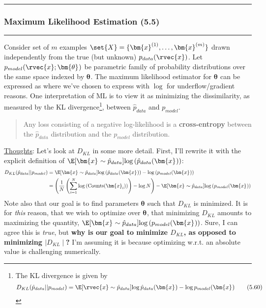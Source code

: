 \documentclass[11pt]{article}
\renewcommand\vec[2][]{\bm{#2}_{#1}}
\newcommand\myspace[1][]{\vspace{#1\bigskipamount}}
\newcommand\p{\Needspace{10\baselineskip} \noindent}
\newcommand\tlab[1]{\tag{#1}\label{#1}}
\newcommand\subsub[1]{\Needspace{15\baselineskip}\hrule\subsubsection{#1}\hrule}
\begin{document}
\myspace\myspace
\subsub{Maximum Likelihood Estimation (5.5)}

\p Consider set of $m$ examples $\set{X} = \{\vec{x}^{(1)}, \ldots, \vec{x}^{(m)} \}$ drawn independently from the true (but unknown) $p_{data}(\rvec{x})$. Let $p_{model}(\rvec{x}; \vec{\theta})$ be parametric family of probability distributions over the same space indexed by $\vec{\theta}$. The maximum likelihood estimator for $\vec{\theta}$ can be expressed as
\graybox{
	\vec[ML]{\theta} &= \argmax_{\vec{\theta}} \E[\rvec{x} \sim \hat{p}_{data}]{\log p_{model}(\vec{x}; \vec{\theta})} \tlab{5.59}
}
where we've chosen to express with $\log$ for underflow/gradient reasons. One interpretation of ML is to view it as minimizing the dissimilarity, as measured by the KL divergence\footnote{
	The KL divergence is given by
	\begin{align}
	D_{KL} (\hat{p}_{data} || p_{model}) 
	= \E[\rvec{x} \sim \hat{p}_{data}]{\log \hat p_{data}(\vec{x}) - \log p_{model}(\vec{x}) } \tlab{5.60}
	\end{align}
}, between $\hat{p}_{data}$ and $p_{model}$. 
\begin{quote}
	Any loss consisting of a negative log-likelihood is a \textbf{cross-entropy} between the $\hat p_{data}$ distribution and the $p_{model}$ distribution.
\end{quote}


\p \underline{Thoughts}: Let's look at $D_{KL}$ in some more detail. First, I'll rewrite it with the explicit definition of $\E[\vec{x} \sim \hat{p}_{data}]{\log\left( \hat{p}_{data}(\vec{x}) \right)}$:
\begin{align}
	D_{KL} (\hat{p}_{data} || p_{model}) 
	&= \E[\vec{x} \sim \hat{p}_{data}]{
			\log\left( \hat{p}_{data}(\vec{x}) \right)
		  - \log\left( p_{model}(\vec{x}) \right)
	} \\
	&= \left( \frac{1}{N} \left( \sum_{i = 1}^{N} \log\left( \text{Counts}(\vec[i]{x})\right) \right)
		- \log N \right)
	- \E[\vec{x} \sim \hat{p}_{data}]{ \log\left( p_{model}(\vec{x}) \right)}
\end{align}
Note also that our goal is to find parameters $\vec{\theta}$ such that $D_{KL}$ is minimized. It is for \textit{this} reason, that we wish to optimize over $\vec{\theta}$, that minimizing $D_{KL}$ amounts to maximizing the quantity, $\E[\vec{x} \sim \hat{p}_{data}]{ \log\left( p_{model}(\vec{x}) \right)}$. Sure, I can agree this is \textit{true}, but \textbf{why is our goal to minimize $D_{KL}$, as opposed to minimizing $\mid D_{KL} \mid$?} I'm assuming it is because optimizing w.r.t. an absolute value is challenging numerically.
\end{document}
